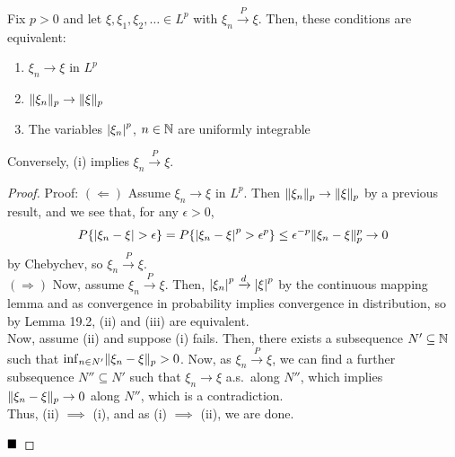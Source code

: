 
\begin{lemma}
    Fix $p > 0$ and let $\xi, \xi_1, \xi_2, \ldots \in L^p$ with $\xi_n \xrightarrow{P} \xi$. Then, these conditions are equivalent:
    \begin{enumerate}[label = (\roman*)]
        \item $\xi_n \to \xi$ in $L^p$
        \item $\lVert {\xi_n} \rVert_p \to \lVert {\xi} \rVert_p$
        \item The variables $\left\lvert {\xi_n} \right\rvert^p$, $n \in \mathbb{N}$ are uniformly integrable
    \end{enumerate}
    Conversely, (i) implies $\xi_n \xrightarrow{P} \xi$.
\end{lemma}
\begin{proof}{Proof:}
    $(\Leftarrow)$ Assume $\xi_n \to \xi$ in $L^p$. Then $\lVert {\xi_n} \rVert_p \to \lVert {\xi} \rVert_p$ by a previous result, and we see that, for any $\epsilon > 0$,
    \[ P\{\left\lvert {\xi_n - \xi} \right\rvert > \epsilon\} = P\{\left\lvert {\xi_n - \xi} \right\rvert^p > \epsilon^p\} \leq \epsilon^{-p}\lVert {\xi_n - \xi} \rVert_p^p \to 0 \]
    by Chebychev, so $\xi_n \xrightarrow{P} \xi$.\\

    $(\Rightarrow)$ Now, assume $\xi_n \xrightarrow{P} \xi$. Then, $\left\lvert {\xi_n} \right\rvert^p \xrightarrow{d} \left\lvert {\xi} \right\rvert^p$ by the continuous mapping lemma and as convergence in probability implies convergence in distribution, so by Lemma 19.2, (ii) and (iii) are equivalent.\\

    
    Now, assume (ii) and suppose (i) fails. Then, there exists a subsequence $N' \subseteq \mathbb{N}$ such that $\inf_{n \in N'} \lVert {\xi_n - \xi} \rVert_p > 0$. Now, as $\xi_n \xrightarrow{P} \xi$, we can find a further subsequence $N'' \subseteq N'$ such that $\xi_n \to \xi$ a.s.\ along $N''$, which implies $\lVert {\xi_n - \xi} \rVert_p \to 0$ along $N''$, which is a contradiction.\\

    Thus, (ii) $\implies$ (i), and as (i) $\implies$ (ii), we are done.

    $\qed$
\end{proof}

